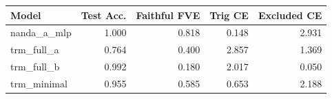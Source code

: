 \begin{tabular}{lrrrr}
\toprule
Model & Test Acc. & Faithful FVE & Trig CE & Excluded CE \\
\midrule
nanda\_a\_mlp & 1.000 & 0.818 & 0.148 & 2.931 \\
trm\_full\_a & 0.764 & 0.400 & 2.857 & 1.369 \\
trm\_full\_b & 0.992 & 0.180 & 2.017 & 0.050 \\
trm\_minimal & 0.955 & 0.585 & 0.653 & 2.188 \\
\bottomrule
\end{tabular}
